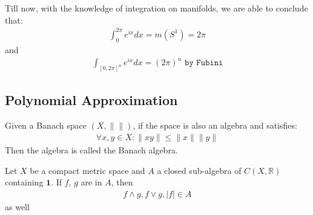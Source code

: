 Till now, with the knowledge of integration on manifolds, we are able to conclude that:
\begin{align*}
	\int_0^{2\pi} e^{ix}  dx = m(S^1) = 2\pi
\end{align*}
and
\begin{align*}
	\int_{[0, 2\pi]^n} e^{ix} dx = (2\pi)^n \texttt{ by Fubini} 
\end{align*}







\subsection{Polynomial Approximation}
\begin{definition}
	Given a Banach space $(X, \| \|)$, if the space is also an algebra and satisfies:
	\begin{align*}
		\forall x, y \in X: \|xy\| \leq \|x\|\|y\|
	\end{align*} 
	Then the algebra is called the Banach algebra.
\end{definition}

\begin{lemma}
	Let $X$ be a compact metric space and $A$ a closed sub-algebra of $C(X, \mathbb{R})$ containing $\mathbf{1}$. If $f$, $g$ are in $A$, then 
	\begin{align*}
		f \wedge g, f \vee g, |f| \in A
	\end{align*}
	as well
\end{lemma}

